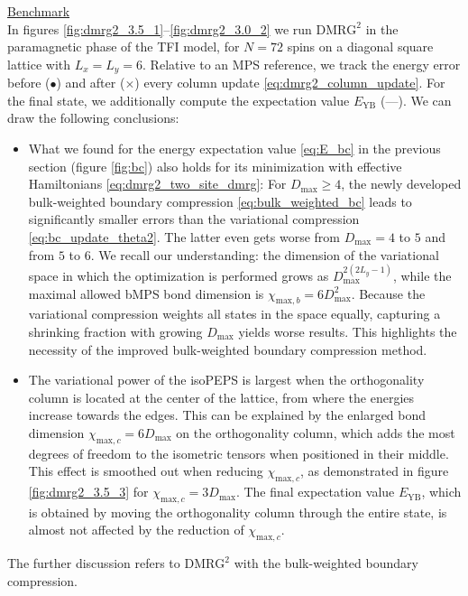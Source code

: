 \noindent \underline{Benchmark} \\[0.5em]
In figures \ref{fig:dmrg2_3.5_1}--\ref{fig:dmrg2_3.0_2} we run $\text{DMRG}^2$ in the paramagnetic phase of the TFI model, for $N = 72$ spins on a diagonal square lattice with $L_x = L_y = 6$. Relative to an MPS reference, we track the energy error before ($\bullet$) and after ($\times$) every column update \eqref{eq:dmrg2_column_update}. For the final state, we additionally compute the expectation value $E_{\text{YB}}$ (---). We can draw the following conclusions:
\begin{itemize}
	\item What we found for the energy expectation value \eqref{eq:E_bc} in the previous section (figure \ref{fig:bc}) also holds for its minimization with effective Hamiltonians \eqref{eq:dmrg2_two_site_dmrg}: For $D_{\text{max}} \geq 4$, the newly developed bulk-weighted boundary compression \eqref{eq:bulk_weighted_bc} leads to significantly smaller errors than the variational compression \eqref{eq:bc_update_theta2}. The latter even gets worse from $D_{\text{max}} = 4$ to $5$ and from $5$ to $6$. We recall our understanding: the dimension of the variational space in which the optimization is performed grows as $D_{\text{max}}^{2(2L_y-1)}$, while the maximal allowed bMPS bond dimension is $\chi_{\text{max}, b} = 6D_{\text{max}}^2$. Because the variational compression weights all states in the space equally, capturing a shrinking fraction with growing $D_{\text{max}}$ yields worse results. This highlights the necessity of the improved bulk-weighted boundary compression method.
	\item The variational power of the isoPEPS is largest when the orthogonality column is located at the center of the lattice, from where the energies increase towards the edges. This can be explained by the enlarged bond dimension $\chi_{\text{max}, c} = 6D_{\text{max}}$ on the orthogonality column, which adds the most degrees of freedom to the isometric tensors when positioned in their middle. This effect is smoothed out when reducing $\chi_{\text{max}, c}$, as demonstrated in figure \ref{fig:dmrg2_3.5_3} for $\chi_{\text{max}, c} = 3D_{\text{max}}$. The final expectation value $E_{\text{YB}}$, which is obtained by moving the orthogonality column through the entire state, is almost not affected by the reduction of $\chi_{\text{max}, c}$.
\end{itemize}
\noindent The further discussion refers to $\text{DMRG}^2$ with the bulk-weighted boundary compression.
